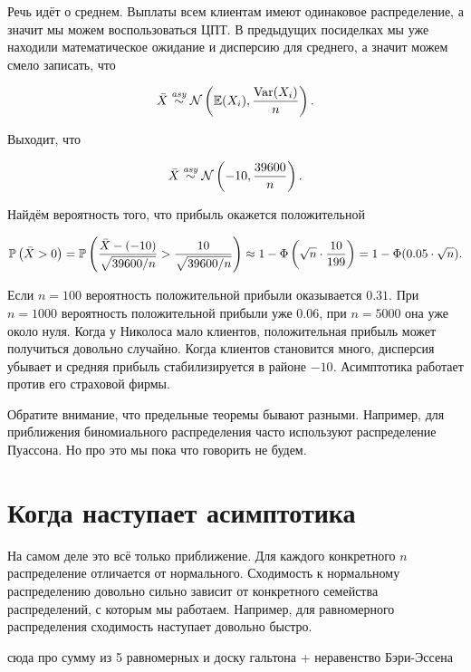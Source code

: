 \documentclass[12pt, a4paper, oneside]{article}
\begin{document}
\begin{sol}
Речь идёт о среднем. Выплаты всем клиентам имеют одинаковое распределение, а значит мы можем воспользоваться ЦПТ. В предыдущих посиделках мы уже находили математическое ожидание и дисперсию для среднего, а значит можем смело записать, что 

\[
\bar{X} \overset{\text{\textit{asy}}}{\sim} \mathcal{N} \left(\mathbb{E}(X_i), \frac{\operatorname{Var}(X_i)}{n} \right).
\] 

Выходит, что 

\[
\bar{X} \overset{\text{\textit{asy}}}{\sim} \mathcal{N} \left(-10, \frac{39600}{n} \right).
\] 

Найдём вероятность того, что прибыль окажется положительной

\[
\mathbb{P} \left(\bar{X} > 0 \right) = \mathbb{P} \left(\frac{\bar{X} - (-10)}{\sqrt{39600/n}} > \frac{10}{\sqrt{39600/n}} \right) \approx 1 - \Phi\left( \sqrt{n} \cdot \frac{10}{199} \right) = 1 - \Phi ( 0.05 \cdot \sqrt{n}).
\]

Если $n=100$ вероятность положительной прибыли оказывается $0.31$. При $n=1000$ вероятность положительной прибыли уже $0.06$, при $n=5000$ она уже около нуля. Когда у Николоса мало клиентов, положительная прибыль может получиться довольно случайно. Когда клиентов становится много, дисперсия убывает и средняя прибыль стабилизируется в районе $-10$. Асимптотика работает против его страховой фирмы. 
\end{sol}

Обратите внимание, что предельные теоремы бывают разными. Например, для приближения биномиального распределения часто используют распределение Пуассона. Но про это мы пока что говорить не будем. 


\section{Когда наступает асимптотика} 

На самом деле это всё только приближение. Для каждого конкретного $n$ распределение отличается от нормального. Сходимость к нормальному распределению довольно сильно зависит от конкретного семейства распределений, с которым мы работаем. Например, для равномерного распределения сходимость наступает довольно быстро.


сюда про сумму из 5 равномерных и доску гальтона + неравенство Бэри-Эссена
\end{document}
